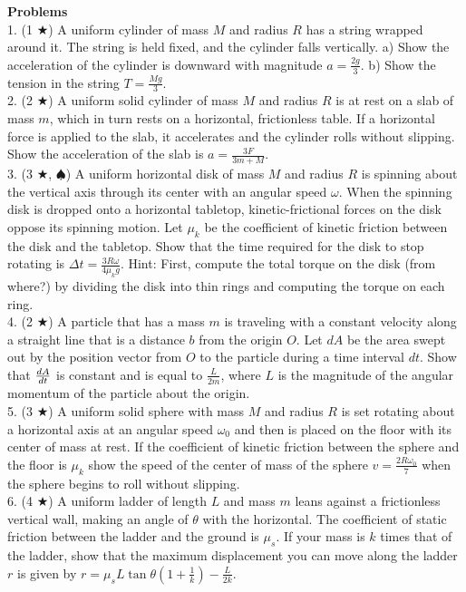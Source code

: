 \noindent \textbf{Problems}\\
1. (1 $\bigstar$) A uniform cylinder of mass $M$ and radius $R$ has a string wrapped around it. The string is held fixed, and the cylinder falls vertically. a) Show the acceleration of the cylinder is downward with magnitude $a = \frac{2g}{3}$. b) Show the tension in the string $T = \frac{Mg}{3}$. \\
2. (2 $\bigstar$) A uniform solid cylinder of mass $M$ and radius $R$ is at rest on a slab of mass $m$, which in turn rests on a horizontal, frictionless table. If a horizontal force is applied to the slab, it accelerates and the cylinder rolls without slipping. Show the acceleration of the slab is $a = \frac{3F}{3m+M}$.\\
3. (3 $\bigstar$, $\spadesuit$) A uniform horizontal disk of mass $M$ and radius $R$ is spinning about the vertical axis through its center with an angular speed $\omega$. When the spinning disk is dropped onto a horizontal tabletop, kinetic-frictional forces on the disk oppose its spinning motion. Let $\mu_k$ be the coefficient of kinetic friction between the disk and the tabletop. Show that the time required for the disk to stop rotating is $\Delta t = \frac{3R\omega}{4\mu_kg}$. Hint: First, compute the total torque on the disk (from where?) by dividing the disk into thin rings and computing the torque on each ring. \\
4. (2 $\bigstar$) A particle that has a mass $m$ is traveling with a constant velocity along a straight line that is a distance $b$ from the origin $O$. Let $dA$ be the area swept out by the position vector from $O$ to the particle during a time interval $dt$. Show that $\frac{d A}{d t}$ is constant and is equal to $\frac{L}{2m}$, where $L$ is the magnitude of the angular momentum of the particle about the origin. \\
5. (3 $\bigstar$) A uniform solid sphere with mass $M$ and radius $R$ is set rotating about a horizontal axis at an angular speed $\omega_0$ and then is placed on the floor with its center of mass at rest. If the coefficient of kinetic friction between the sphere and the floor is $\mu_k$ show the speed of the center of mass of the sphere $v = \frac{2R\omega_0}{7}$ when the sphere begins to roll without slipping. \\
6. (4 $\bigstar$) A uniform ladder of length $L$ and mass $m$ leans against a frictionless vertical wall, making an angle of $\theta$ with the horizontal. The coefficient of static friction between the ladder and the ground is $\mu_s$. If your mass is $k$ times that of the ladder, show that the maximum displacement you can move along the ladder $r$ is given by $r = \mu_s L\tan\theta\left(1 + \frac{1}{k}\right) - \frac{L}{2k}$. \\
